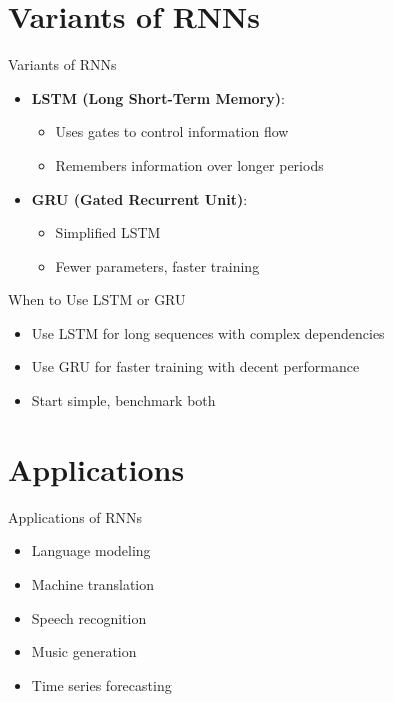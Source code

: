 \documentclass{beamer}
\begin{document}
\section{Variants of RNNs}
\begin{frame}{Variants of RNNs}
\begin{itemize}
    \item \textbf{LSTM (Long Short-Term Memory)}:
        \begin{itemize}
            \item Uses gates to control information flow
            \item Remembers information over longer periods
        \end{itemize}
    \item \textbf{GRU (Gated Recurrent Unit)}:
        \begin{itemize}
            \item Simplified LSTM
            \item Fewer parameters, faster training
        \end{itemize}
\end{itemize}
\end{frame}

\begin{frame}{When to Use LSTM or GRU}
\begin{itemize}
    \item Use LSTM for long sequences with complex dependencies
    \item Use GRU for faster training with decent performance
    \item Start simple, benchmark both
\end{itemize}
\end{frame}

\section{Applications}
\begin{frame}{Applications of RNNs}
\begin{itemize}
    \item Language modeling
    \item Machine translation
    \item Speech recognition
    \item Music generation
    \item Time series forecasting
\end{itemize}
\end{frame}
\end{document}
